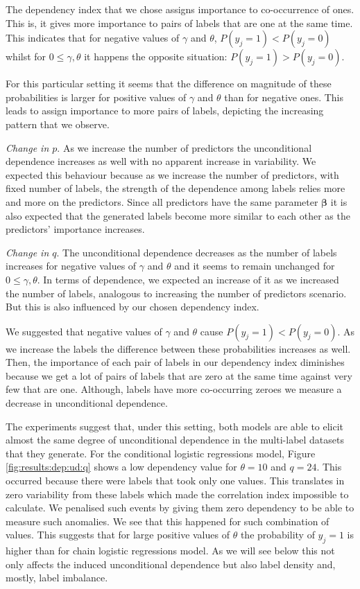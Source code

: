 \documentclass[review]{elsarticle}
\begin{document}
{		The dependency index that we chose assigns importance to co-occurrence of ones. This is, it gives more importance to pairs of labels that are one at the same time. This indicates that for negative values of $\gamma$ and $\theta$, $P(y_{j}=1) < P(y_{j}=0)$ whilst for $0 \leq \gamma, \theta$ it happens the opposite situation: $P(y_{j}=1) > P(y_{j}=0)$. 
		
		For this particular setting it seems that the difference on magnitude of these probabilities is larger for positive values of $\gamma$ and $\theta$ than for negative ones. This leads to assign importance to more pairs of labels, depicting the increasing pattern that we observe.
		
		\emph{Change in $p$}. As we increase the number of predictors the unconditional dependence increases as well with no apparent increase in variability. We expected this behaviour because as we increase the number of predictors, with fixed number of labels, the strength of the dependence among labels relies more and more on the predictors. Since all predictors have the same parameter $\bm{\beta}$ it is also expected that the generated labels become more similar to each other as the predictors' importance increases. 
		
		\emph{Change in $q$}. The unconditional dependence decreases as the number of labels increases for negative values of $\gamma$ and $\theta$ and it seems to remain unchanged for $0 \leq \gamma, \theta$. In terms of dependence, we expected an increase of it as we increased the number of labels, analogous to increasing the number of predictors scenario. But this is also influenced by our chosen dependency index.
		
		We suggested that negative values of $\gamma$ and $\theta$ cause $P(y_{j}=1) < P(y_{j}=0)$. As we increase the labels the difference between these probabilities increases as well. Then, the importance of each pair of labels in our dependency index diminishes because we get a lot of pairs of labels that are zero at the same time against very few that are one. Although, labels have more co-occurring zeroes we measure a decrease in unconditional dependence.
		
		The experiments suggest that, under this setting, both models are able to elicit almost the same degree of unconditional dependence in the multi-label datasets that they generate. For the conditional logistic regressions model, Figure \ref{fig:results:dep:ud:q} shows a low dependency value for $\theta=10$ and $q=24$. This occurred because there were labels that took only one values. This translates in zero variability from these labels which made the correlation index impossible to calculate. We penalised such events by giving them zero dependency to be able to measure such anomalies. We see that this happened for such combination of values. This suggests that for large positive values of $\theta$ the probability of $y_{j}=1$ is higher than for chain logistic regressions model. As we will see below this not only affects the induced unconditional dependence but also label density and, mostly, label imbalance.
		
}
\end{document}
